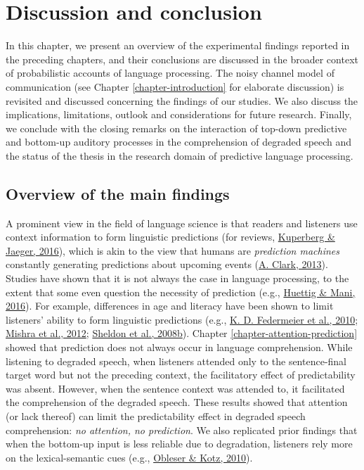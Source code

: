 \documentclass[a4paper, nobind]{templates/ociamthesis}
\begin{document}
\hypertarget{chapter-conclusion}{%
\chapter{Discussion and conclusion}\label{chapter-conclusion}}

In this chapter, we present an overview of the experimental findings reported in the preceding chapters, and
their conclusions are discussed in the broader context of probabilistic accounts of language processing.
The noisy channel model of communication (see Chapter \ref{chapter-introduction} for elaborate discussion) is revisited and discussed concerning the findings of our studies.
We also discuss the implications, limitations, outlook and considerations for future research.
Finally, we conclude with the closing remarks on the interaction of top-down predictive and bottom-up auditory processes in the comprehension of degraded speech
and the status of the thesis in the research domain of predictive language processing.

\hypertarget{overview-of-the-main-findings}{%
\section{Overview of the main findings}\label{overview-of-the-main-findings}}

A prominent view in the field of language science is that readers and listeners use context information to form linguistic predictions (for reviews, \protect\hyperlink{ref-Kuperberg2016}{Kuperberg \& Jaeger, 2016}),
which is akin to the view that humans are \emph{prediction machines} constantly generating predictions about upcoming events (\protect\hyperlink{ref-Clark2013}{A. Clark, 2013}).
Studies have shown that it is not always the case in language processing,
to the extent that some even question the necessity of prediction (e.g., \protect\hyperlink{ref-Huettig2016}{Huettig \& Mani, 2016}).
For example, differences in age and literacy have been shown to limit listeners' ability to form linguistic predictions (e.g., \protect\hyperlink{ref-Federmeier2010}{K. D. Federmeier et al., 2010}; \protect\hyperlink{ref-Mishra2012}{Mishra et al., 2012}; \protect\hyperlink{ref-Sheldon2008b}{Sheldon et al., 2008b}).
Chapter \ref{chapter-attention-prediction} showed that prediction does not always occur in language comprehension.
While listening to degraded speech, when listeners attended only to the sentence-final target word but not the preceding context, the facilitatory effect of predictability was absent.
However, when the sentence context was attended to, it facilitated the comprehension of the degraded speech.
These results showed that attention (or lack thereof) can limit the predictability effect in degraded speech comprehension: \emph{no attention, no prediction}.
We also replicated prior findings that when the bottom-up input is less reliable due to degradation,
listeners rely more on the lexical-semantic cues (e.g., \protect\hyperlink{ref-Obleser2010}{Obleser \& Kotz, 2010}).
\end{document}
